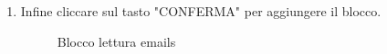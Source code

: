\begin{enumerate}
	\item Infine cliccare sul tasto "CONFERMA" per aggiungere il blocco.
	\begin{figure}[!ht]
		\centering
		\caption{Blocco lettura emails}
	\end{figure}
\end{enumerate}
\newpage

